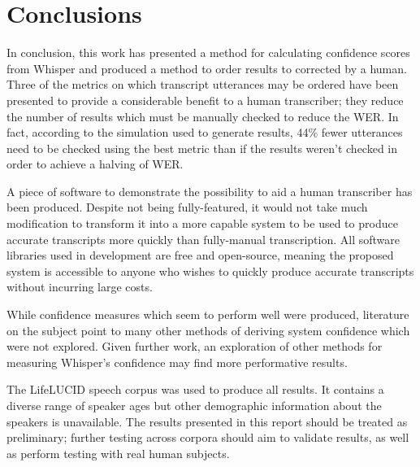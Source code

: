 \chapter{Conclusions}\label{ch:conclusions}

In conclusion, this work has presented a method for calculating confidence scores from Whisper and produced a method to order results to corrected by a human.
Three of the metrics on which transcript utterances may be ordered have been presented to provide a considerable benefit to a human transcriber; they reduce the number of results which must be manually checked to reduce the WER.
In fact, according to the simulation used to generate results, 44\% fewer utterances need to be checked using the best metric than if the results weren't checked in order to achieve a halving of WER.

A piece of software to demonstrate the possibility to aid a human transcriber has been produced.
Despite not being fully-featured, it would not take much modification to transform it into a more capable system to be used to produce accurate transcripts more quickly than fully-manual transcription.
All software libraries used in development are free and open-source, meaning the proposed system is accessible to anyone who wishes to quickly produce accurate transcripts without incurring large costs.

While confidence measures which seem to perform well were produced, literature on the subject point to many other methods of deriving system confidence which were not explored.
Given further work, an exploration of other methods for measuring Whisper's confidence may find more performative results.

The LifeLUCID speech corpus was used to produce all results.
It contains a diverse range of speaker ages but other demographic information about the speakers is unavailable.
The results presented in this report should be treated as preliminary; further testing across corpora should aim to validate results, as well as perform testing with real human subjects.
